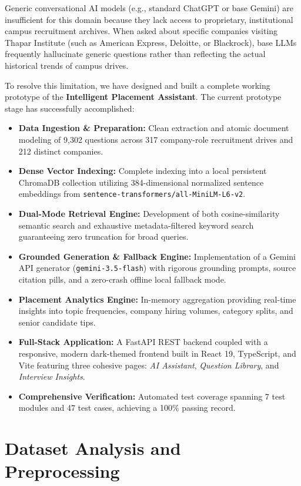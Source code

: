 \documentclass[11pt]{article}
\begin{document}
Generic conversational AI models (e.g., standard ChatGPT or base Gemini) are insufficient for this domain because they lack access to proprietary, institutional campus recruitment archives. When asked about specific companies visiting Thapar Institute (such as American Express, Deloitte, or Blackrock), base LLMs frequently hallucinate generic questions rather than reflecting the actual historical trends of campus drives.

To resolve this limitation, we have designed and built a complete working prototype of the \textbf{Intelligent Placement Assistant}. The current prototype stage has successfully accomplished:
\begin{itemize}[leftmargin=1.5em]
    \item \textbf{Data Ingestion \& Preparation:} Clean extraction and atomic document modeling of 9,302 questions across 317 company-role recruitment drives and 212 distinct companies.
    \item \textbf{Dense Vector Indexing:} Complete indexing into a local persistent ChromaDB collection utilizing 384-dimensional normalized sentence embeddings from \texttt{sentence-transformers/all-MiniLM-L6-v2}.
    \item \textbf{Dual-Mode Retrieval Engine:} Development of both cosine-similarity semantic search and exhaustive metadata-filtered keyword search guaranteeing zero truncation for broad queries.
    \item \textbf{Grounded Generation \& Fallback Engine:} Implementation of a Gemini API generator (\texttt{gemini-3.5-flash}) with rigorous grounding prompts, source citation pills, and a zero-crash offline local fallback mode.
    \item \textbf{Placement Analytics Engine:} In-memory aggregation providing real-time insights into topic frequencies, company hiring volumes, category splits, and senior candidate tips.
    \item \textbf{Full-Stack Application:} A FastAPI REST backend coupled with a responsive, modern dark-themed frontend built in React 19, TypeScript, and Vite featuring three cohesive pages: \textit{AI Assistant}, \textit{Question Library}, and \textit{Interview Insights}.
    \item \textbf{Comprehensive Verification:} Automated test coverage spanning 7 test modules and 47 test cases, achieving a 100\% passing record.
\end{itemize}

\section{Dataset Analysis and Preprocessing}
\end{document}
